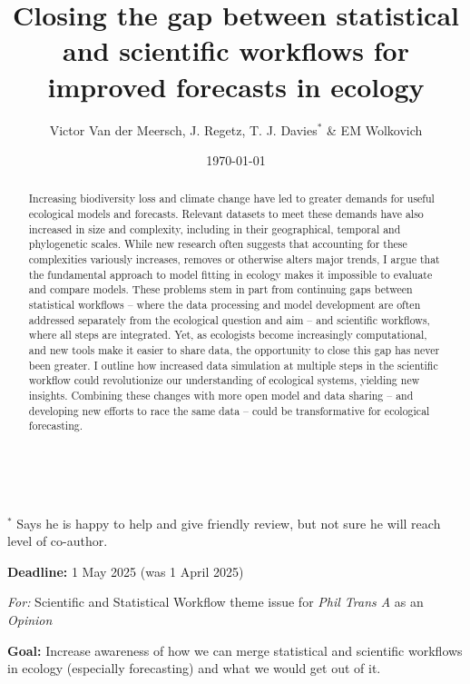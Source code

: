 \documentclass[11pt]{article}
\begin{document}
\renewcommand{\refname}{\CHead{}}

\title{Closing the gap between statistical and scientific workflows for improved forecasts in ecology } 
\date{\today}
\author{Victor Van der Meersch, J. Regetz, T. J. Davies$^*$ \& EM Wolkovich}\\
 \maketitle
$^*$ Says he is happy to help and give friendly review, but not sure he will reach level of co-author. 

{\bf Deadline:} 1 May 2025 (was 1 April 2025)

\emph{For:} Scientific and Statistical Workflow theme issue for \emph{Phil Trans A} as an \emph{Opinion}

\begin{abstract}
Increasing biodiversity loss and climate change have led to greater demands for useful ecological models and forecasts. Relevant datasets to meet these demands have also increased in size and complexity, including in their geographical, temporal and phylogenetic scales. While new research often suggests that accounting for these complexities variously increases, removes or otherwise alters major trends, I argue that the fundamental approach to model fitting in ecology makes it impossible to evaluate and compare models. These problems stem in part from continuing gaps between statistical workflows -- where the data processing and model development are often addressed separately from the ecological question and aim -- and scientific workflows, where all steps are integrated. Yet, as ecologists become increasingly computational, and new tools make it easier to share data, the opportunity to close this gap has never been greater. I outline how increased data simulation at multiple steps in the scientific workflow could revolutionize our understanding of ecological systems, yielding new insights. Combining these changes with more open model and data sharing -- and developing new efforts to race the same data -- could be transformative for ecological forecasting. 
\end{abstract}

{\bf Goal:} Increase awareness of how we can merge statistical and scientific workflows in ecology (especially forecasting) and what we would get out of it.
\end{document}
